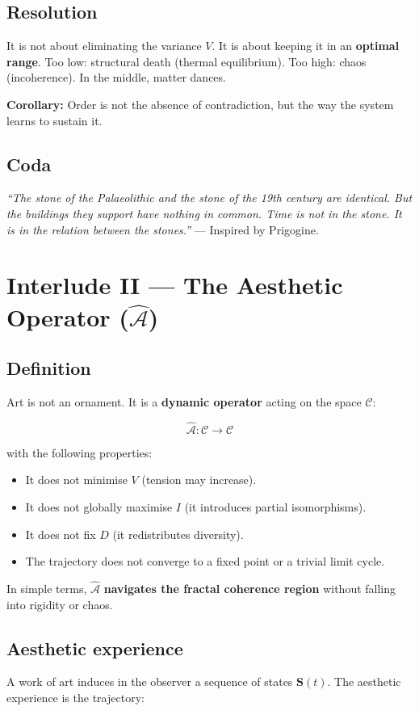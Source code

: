 \documentclass[12pt,oneside]{report}
\begin{document}
\section{Resolution}
It is not about eliminating the variance \(V\). It is about keeping it in an \textbf{optimal range}. Too low: structural death (thermal equilibrium). Too high: chaos (incoherence). In the middle, matter dances.

\textbf{Corollary:} Order is not the absence of contradiction, but the way the system learns to sustain it.

\section{Coda}
\emph{“The stone of the Palaeolithic and the stone of the 19th century are identical. But the buildings they support have nothing in common. Time is not in the stone. It is in the relation between the stones.”}  
— Inspired by Prigogine.

\chapter{Interlude II — The Aesthetic Operator (\(\hat{\mathcal{A}}\))}

\section{Definition}
Art is not an ornament. It is a \textbf{dynamic operator} acting on the space \(\mathcal{C}\):

\[
\hat{\mathcal{A}} : \mathcal{C} \longrightarrow \mathcal{C}
\]

with the following properties:
\begin{itemize}
\item It does not minimise \(V\) (tension may increase).
\item It does not globally maximise \(I\) (it introduces partial isomorphisms).
\item It does not fix \(D\) (it redistributes diversity).
\item The trajectory does not converge to a fixed point or a trivial limit cycle.
\end{itemize}
In simple terms, \(\hat{\mathcal{A}}\) \textbf{navigates the fractal coherence region} without falling into rigidity or chaos.

\section{Aesthetic experience}
A work of art induces in the observer a sequence of states \(\mathbf{S}(t)\). The aesthetic experience is the trajectory:
\end{document}
